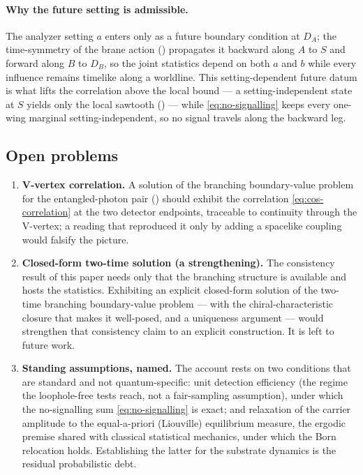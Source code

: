 \paragraph{Why the future setting is admissible.}
The analyzer setting $a$ enters only as a future boundary condition at $D_A$; the time-symmetry of
the brane action () propagates it backward along $A$ to $S$ and forward
along $B$ to $D_B$, so the joint statistics depend on both $a$ and $b$ while every influence
remains timelike along a worldline. This setting-dependent future datum is what lifts the
correlation above the local bound --- a setting-independent state at $S$ yields only the local
sawtooth () --- while \eqref{eq:no-signalling} keeps every
one-wing marginal setting-independent, so no signal travels along the backward leg.

\subsection{Open problems}
\label{subsec:bell-open}

\begin{enumerate}
  \item \textbf{V-vertex correlation.}
  A solution of the branching boundary-value problem for the entangled-photon pair
  () should exhibit the correlation \eqref{eq:cos-correlation} at
  the two detector endpoints, traceable to continuity through the V-vertex; a reading that
  reproduced it only by adding a spacelike coupling would falsify the picture.

  \item \textbf{Closed-form two-time solution (a strengthening).}
  The consistency result of this paper needs only that the branching structure is available and
  hosts the statistics. Exhibiting an explicit closed-form solution of the two-time branching
  boundary-value problem --- with the chiral-characteristic closure that makes it well-posed, and a
  uniqueness argument --- would strengthen that consistency claim to an explicit construction. It
  is left to future work.

  \item \textbf{Standing assumptions, named.}
  The account rests on two conditions that are standard and not quantum-specific: unit detection
  efficiency (the regime the loophole-free tests reach, not a fair-sampling assumption), under
  which the no-signalling sum \eqref{eq:no-signalling} is exact; and relaxation of the carrier
  amplitude to the equal-a-priori (Liouville) equilibrium measure, the ergodic premise shared with
  classical statistical mechanics, under which the Born relocation holds. Establishing the latter
  for the substrate dynamics is the residual probabilistic debt.
\end{enumerate}